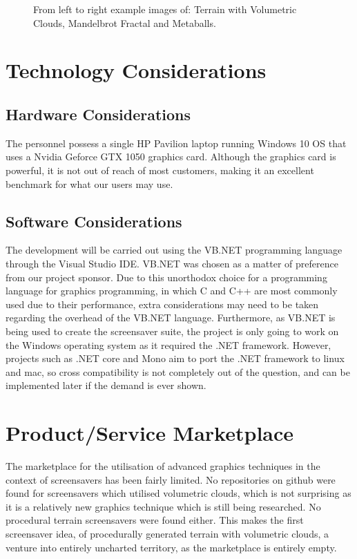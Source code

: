 \documentclass[10pt, openany]{book}
\begin{document}
\begin{figure}[H]
\begin{minipage}{.3\textwidth}
\end{minipage}
\caption{From left to right example images of: Terrain with Volumetric Clouds, Mandelbrot Fractal and Metaballs.}
\end{figure}	

\section{Technology Considerations}

\subsection{Hardware Considerations}

The personnel possess a single HP Pavilion laptop running Windows 10 OS that uses a Nvidia Geforce GTX 1050 graphics card. Although the graphics card is powerful, it is not out of reach of most customers, making it an excellent benchmark for what our users may use.

\subsection{Software Considerations}

The development will be carried out using the VB.NET programming language through the Visual Studio IDE. VB.NET was chosen as a matter of preference from our project sponsor. Due to this unorthodox choice for a programming language for graphics programming, in which C and C++ are most commonly used due to their performance, extra considerations may need to be taken regarding the overhead of the VB.NET language. Furthermore, as VB.NET is being used to create the screensaver suite, the project is only going to work on the Windows operating system as it required the .NET framework. However, projects such as .NET core and Mono aim to port the .NET framework to linux and mac, so cross compatibility is not completely out of the question, and can be implemented later if the demand is ever shown. 

\section{Product/Service Marketplace}

The marketplace for the utilisation of advanced graphics techniques in the context of screensavers has been fairly limited. No repositories on github were found for screensavers which utilised volumetric clouds, which is not surprising as it is a relatively new graphics technique which is still being researched. No procedural terrain screensavers were found either. This makes the first screensaver idea, of procedurally generated terrain with volumetric clouds, a venture into entirely uncharted territory, as the marketplace is entirely empty.
\end{document}
